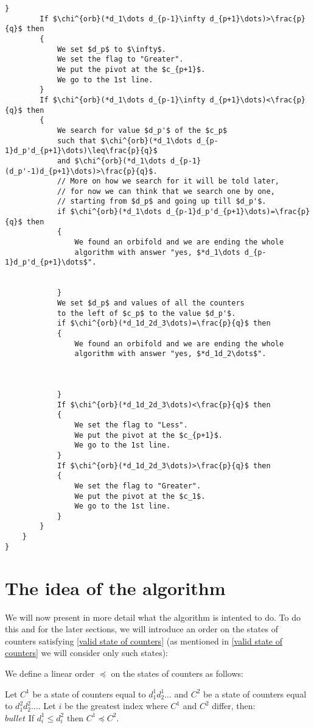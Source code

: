 \begin{lstlisting}[firstnumber=1,consecutivenumbers=true]
        } 
        If $\chi^{orb}(*d_1\dots d_{p-1}\infty d_{p+1}\dots)>\frac{p}{q}$ then
        {
            We set $d_p$ to $\infty$.
            We set the flag to "Greater".
            We put the pivot at the $c_{p+1}$.
            We go to the 1st line.
        }  
        If $\chi^{orb}(*d_1\dots d_{p-1}\infty d_{p+1}\dots)<\frac{p}{q}$ then
        {
            We search for value $d_p'$ of the $c_p$ 
            such that $\chi^{orb}(*d_1\dots d_{p-1}d_p'd_{p+1}\dots)\leq\frac{p}{q}$ 
            and $\chi^{orb}(*d_1\dots d_{p-1}(d_p'-1)d_{p+1}\dots)>\frac{p}{q}$.
            // More on how we search for it will be told later, 
            // for now we can think that we search one by one,
            // starting from $d_p$ and going up till $d_p'$.
            if $\chi^{orb}(*d_1\dots d_{p-1}d_p'd_{p+1}\dots)=\frac{p}{q}$ then 
            {
                We found an orbifold and we are ending the whole
                algorithm with answer "yes, $*d_1\dots d_{p-1}d_p'd_{p+1}\dots$".
                
                
            }
            We set $d_p$ and values of all the counters 
            to the left of $c_p$ to the value $d_p'$.
            if $\chi^{orb}(*d_1d_2d_3\dots)=\frac{p}{q}$ then 
            {
                We found an orbifold and we are ending the whole
                algorithm with answer "yes, $*d_1d_2\dots$".
                
                
                
            }
            If $\chi^{orb}(*d_1d_2d_3\dots)<\frac{p}{q}$ then 
            {
                We set the flag to "Less".
                We put the pivot at the $c_{p+1}$.
                We go to the 1st line.
            }
            If $\chi^{orb}(*d_1d_2d_3\dots)>\frac{p}{q}$ then 
            {
                We set the flag to "Greater".
                We put the pivot at the $c_1$.
                We go to the 1st line.
            }
        }  
    }
}
\end{lstlisting}
\section{The idea of the algorithm}
We will now present in more detail what the algorithm is intented to do. 
To do this and for the later sections, we will introduce an order on the states 
of counters satisfying \ref{valid state of counters} (as mentioned in 
\ref{valid state of counters} we will consider only such states): 
\begin{definition}
We define a linear order $\preceq$ on the states of counters as follows:

Let $C^1$ be a state of counters equal to $d_1^1d_2^1\dots$ and $C^2$ be a state of counters 
equal to $d_1^2d_2^2\dots$. Let $i$ be the greatest index where $C^1$ and $C^2$ differ, then:\\
$bullet$ If $d_i^1 \leq d_i^2$ then $C^1 \preceq C^2$. 
\end{definition}

